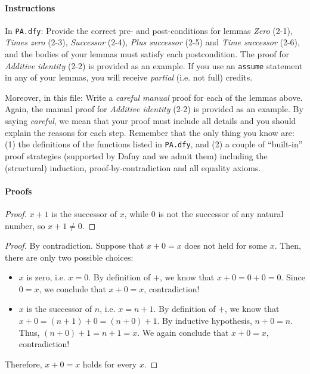\documentclass[11pt,a4paper]{article}
\begin{document}
\paragraph*{Instructions}

In \texttt{PA.dfy}:
Provide the correct pre- and post-conditions for lemmas \emph{Zero} (2-1), \emph{Times zero} (2-3), \emph{Successor} (2-4), \emph{Plus successor} (2-5) and \emph{Time successor} (2-6),
and the bodies of your lemmas must satisfy each postcondition.
The proof for \emph{Additive identity} (2-2) is provided as an example.
If you use an \texttt{assume} statement in any of your lemmas, you will receive \emph{partial} (i.e. not full) credits.

Moreover, in this file:
Write a \emph{careful manual} proof for each of the lemmas above.
Again, the manual proof for \emph{Additive identity} (2-2) is  provided as an example.
By saying \emph{careful}, we mean that your proof must include all details and you should explain the reasons for each step.
Remember that the only thing you know are:
(1) the definitions of the functions listed in \texttt{PA.dfy}, and 
(2) a couple of ``built-in'' proof strategies (supported by Dafny and we admit them) including the (structural) induction, proof-by-contradiction and all equality axioms.

\paragraph{Proofs}


\begin{proof}
  $x + 1$ is the successor of $x$, while $0$ is not the successor of any natural number, so $x + 1 \ne 0$.
\end{proof}


\begin{proof}
  By contradiction. Suppose that $x + 0 = x$ does not held for some $x$. Then, there are only two possible choices:
  \begin{itemize}
    \item $x$ is zero, i.e. $x = 0$. By definition of $+$, we know that $x + 0 = 0 + 0 = 0$. Since $0 = x$, we conclude that $x + 0 = x$, contradiction!
    \item $x$ is the successor of $n$, i.e. $x = n + 1$. By definition of $+$, we know that $x + 0 = (n + 1) + 0 = (n + 0) + 1$. By inductive hypothesis, $n + 0 = n$. Thus, $(n + 0) + 1 = n + 1 = x$. We again conclude that $x + 0 = x$, contradiction!
  \end{itemize}
  Therefore, $x + 0 = x$ holds for every $x$.
\end{proof}
\end{document}
